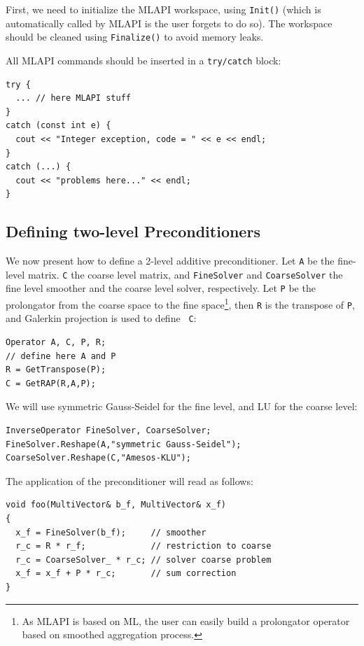 \documentclass{article}[11pt]
\newcommand{\MLAPI}  {{\sc MLAPI }}
\begin{document}
First, we need to initialize the \MLAPI workspace, using {\tt Init()} 
(which is automatically called by \MLAPI is the user forgets to do so). The
workspace should be cleaned using {\tt Finalize()} to avoid memory leaks.

All \MLAPI commands should be inserted
in a {\tt try/catch} block:
\begin{verbatim}
try {
  ... // here MLAPI stuff
}
catch (const int e) {
  cout << "Integer exception, code = " << e << endl;
} 
catch (...) {
  cout << "problems here..." << endl;
}
\end{verbatim}

\subsection{Defining two-level Preconditioners}
\label{sec:two-level}

We now present how to define a 2-level additive
preconditioner. Let {\tt A} be the fine-level matrix.
{\tt C}  the coarse level matrix,
and {\tt FineSolver} and {\tt CoarseSolver} 
the fine level smoother and the coarse level solver,
respectively. Let {\tt P} be the prolongator from the coarse space to the fine
space\footnote{As \MLAPI is based on ML, the user can easily build a
  prolongator operator based on smoothed aggregation process.}, then {\tt R}
  is the transpose of {\tt P}, and Galerkin projection is used to define {\tt
    C}:
\begin{verbatim}
Operator A, C, P, R;
// define here A and P
R = GetTranspose(P);
C = GetRAP(R,A,P);
\end{verbatim} 
We will use symmetric Gauss-Seidel
for the fine level, and LU for the coarse level:
\begin{verbatim}
InverseOperator FineSolver, CoarseSolver;
FineSolver.Reshape(A,"symmetric Gauss-Seidel");
CoarseSolver.Reshape(C,"Amesos-KLU");
\end{verbatim}
The application of the preconditioner will read as follows:
\begin{verbatim}
void foo(MultiVector& b_f, MultiVector& x_f)
{
  x_f = FineSolver(b_f);     // smoother
  r_c = R * r_f;             // restriction to coarse
  r_c = CoarseSolver_ * r_c; // solver coarse problem
  x_f = x_f + P * r_c;       // sum correction
}
\end{verbatim}
\end{document}

